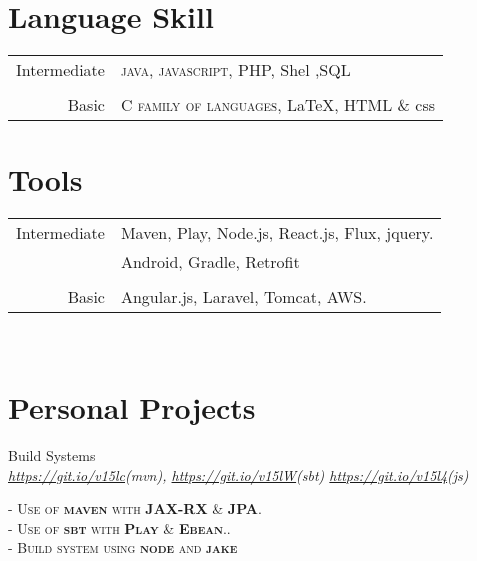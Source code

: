 \documentclass[10pt]{article} %
\begin{document}
{\begin{minipage}[t]{0.44\textwidth}
\section{Language Skill} 

\begin{tabular}{rl}
Intermediate 
& \textsc{java}, \textsc{javascript}, PHP, Shel ,SQL\\
&\\
Basic 
& \textsc{C family of languages}, \LaTeX, HTML \& css\\
\end{tabular}


\section{Tools} 

\begin{tabular}{rl}
	
Intermediate
& Maven, Play, Node.js, React.js, Flux, jquery. \\
& Android, Gradle, Retrofit\\
& \\
Basic
& Angular.js, Laravel, Tomcat, AWS.\\
\end{tabular}\\[10pt]

\section{Personal Projects} 




{\raggedright\large Build Systems \\
	\textit{\href {https://github.com/Bitaron/java-maven}{https://git.io/v15lc}(mvn), \href{https://github.com/Bitaron/java-sbt}{https://git.io/v15lW}(sbt)
		\href{https://github.com/Bitaron/js}{https://git.io/v15l4}(js)}\\[5pt]}
\textsc{- Use of \textbf{maven} with \textbf{JAX-RX} \& \textbf{JPA}. }\\
\textsc{- Use of \textbf{sbt} with \textbf{Play} \& \textbf{Ebean}..}\\
\textsc{- Build system using \textbf{node} and \textbf{jake}}\\
\normalsize{}\\



\end{minipage}}
\end{document}
